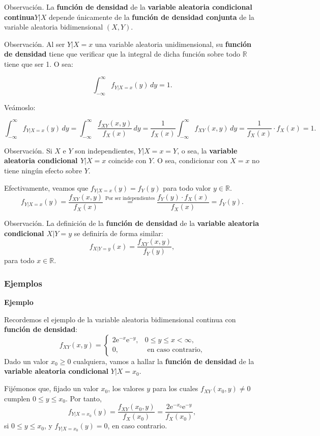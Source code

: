 \documentclass[]{book}
\begin{document}
Observación.
La \textbf{función de densidad} de la \textbf{variable aleatoria condicional continua\(Y|X\)} depende únicamente de la \textbf{función de densidad conjunta} de la variable aleatoria bidimensional \((X,Y)\).

Observación.
Al ser \(Y|X=x\) una variable aleatoria unidimensional, su \textbf{función de densidad} tiene que verificar que la integral de dicha función sobre todo \(\mathbb{R}\) tiene que ser 1. O sea:

\[
\int_{-\infty}^\infty f_{Y|X=x}(y)\, dy=1.
\]

Veámoslo:

\[
\int_{-\infty}^\infty f_{Y|X=x}(y)\, dy =\int_{-\infty}^\infty \frac{f_{XY}(x,y)}{f_X(x)}\, dy=\frac{1}{f_X(x)}\int_{-\infty}^\infty f_{XY}(x,y)\, dy= \frac{1}{f_X(x)}\cdot f_X(x) =1.
\]

Observación.
Si \(X\) e \(Y\) son independientes, \(Y|X=x =Y\), o sea, la \textbf{variable aleatoria condicional \(Y|X=x\)} coincide con \(Y\). O sea, condicionar con \(X=x\) no tiene ningún efecto sobre \(Y\).

Efectivamente, veamos que \(f_{Y|X=x}(y)=f_Y(y)\) para todo valor \(y\in\mathbb{R}.\)
\[
f_{Y|X=x}(y) =\frac{f_{XY}(x,y)}{f_X(x)} \stackrel{\mbox{Por ser independientes}}{=}\frac{f_Y(y)\cdot f_X(x)}{f_X(x)}=f_Y(y).
\]

Observación.
La definición de la \textbf{función de densidad} de la \textbf{variable aleatoria condicional \(X|Y=y\)} se definiría de forma similar:
\[
f_{X|Y=y}(x)=\frac{f_{XY}(x,y)}{f_Y(y)},
\]
para todo \(x\in\mathbb{R}\).

\hypertarget{ejemplos-10}{%
\subsubsection{Ejemplos}\label{ejemplos-10}}

\textbf{Ejemplo}

Recordemos el ejemplo de la variable aleatoria bidimensional continua con \textbf{función de densidad}:
\[
f_{XY}(x,y)=\begin{cases}
2 \mathrm{e}^{-x}\mathrm{e}^{-y}, & 0\leq y\leq x < \infty,\\
0, & \mbox{ en caso contrario,}
\end{cases}
\]
Dado un valor \(x_0\geq 0\) cualquiera, vamos a hallar la \textbf{función de densidad} de la \textbf{variable aleatoria condicional} \(Y|X=x_0\).

Fijémonos que, fijado un valor \(x_0\), los valores \(y\) para los cuales \(f_{XY}(x_0,y)\neq 0\) cumplen \(0\leq y\leq x_0\).
Por tanto,
\[
f_{Y|X=x_0}(y)=\frac{f_{XY}(x_0,y)}{f_X(x_0)}=\frac{2\mathrm{e}^{-x_0}\mathrm{e}^{-y}}{f_X(x_0)},
\]
si \(0\leq y\leq x_0\), y \(f_{Y|X=x_0}(y)=0\), en caso contrario.
\end{document}
